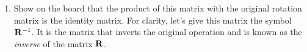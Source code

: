 \begin{prob}
\begin{enumerate}
\item Show on the board that the product of this matrix with the original rotation matrix is the identity matrix. For clarity, let's give this matrix the symbol $\mathbf{R}^{-1}$. It is the matrix that inverts the original operation and is known as the \textit{inverse} of the matrix $\mathbf{R}$.
\end{enumerate}
\end{prob}
